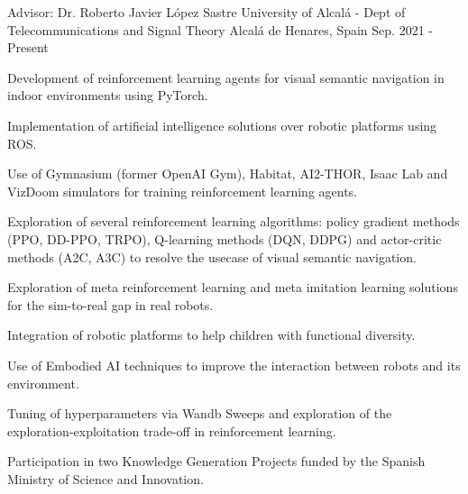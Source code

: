 

\begin{cventries}

    \cventry
    {Advisor: Dr. Roberto Javier López Sastre} %
    {University of Alcalá - Dept of Telecommunications and Signal Theory} %
    {Alcalá de Henares, Spain} %
    {Sep. 2021 - Present} %
    {
        \begin{cvitems} %
            \item {Development of reinforcement learning agents for visual semantic navigation in indoor environments using PyTorch.}
            \item {Implementation of artificial intelligence solutions over robotic platforms using ROS.}
            \item {Use of Gymnasium (former OpenAI Gym), Habitat, AI2-THOR, Isaac Lab and VizDoom simulators for training reinforcement learning agents.}
            \item {Exploration of several reinforcement learning algorithms: policy gradient methods (PPO, DD-PPO, TRPO), Q-learning methods (DQN, DDPG) and actor-critic methods (A2C, A3C) to resolve the usecase of visual semantic navigation.}
            \item {Exploration of meta reinforcement learning and meta imitation learning solutions for the sim-to-real gap in real robots.}
            \item {Integration of robotic platforms to help children with functional diversity.}
            \item {Use of Embodied AI techniques to improve the interaction between robots and its environment.}
            \item {Tuning of hyperparameters via Wandb Sweeps and exploration of the exploration-exploitation trade-off in reinforcement learning.}
            \item {Participation in two Knowledge Generation Projects funded by the Spanish Ministry of Science and Innovation.}
        \end{cvitems}
    }


\end{cventries}
